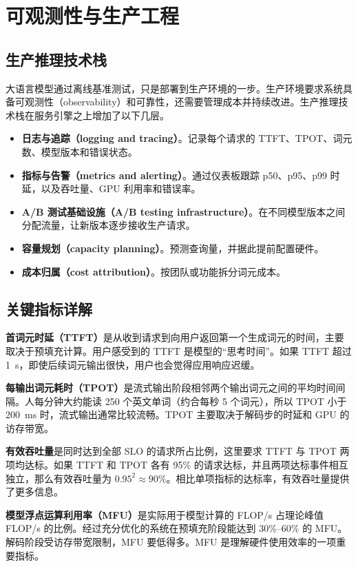 \chapter{可观测性与生产工程}

\section{生产推理技术栈}

大语言模型通过离线基准测试，只是部署到生产环境的一步。生产环境要求系统具备可观测性（observability）和可靠性，还需要管理成本并持续改进。生产推理技术栈在服务引擎之上增加了以下几层。
\begin{itemize}
  \item \textbf{日志与追踪（logging and tracing）}。记录每个请求的 TTFT、TPOT、词元数、模型版本和错误状态。
  \item \textbf{指标与告警（metrics and alerting）}。通过仪表板跟踪 p50、p95、p99 时延，以及吞吐量、GPU 利用率和错误率。
  \item \textbf{A/B 测试基础设施（A/B testing infrastructure）}。在不同模型版本之间分配流量，让新版本逐步接收生产请求。
  \item \textbf{容量规划（capacity planning）}。预测查询量，并据此提前配置硬件。
  \item \textbf{成本归属（cost attribution）}。按团队或功能拆分词元成本。
\end{itemize}

\section{关键指标详解}

\textbf{首词元时延（TTFT）}是从收到请求到向用户返回第一个生成词元的时间，主要取决于预填充计算。用户感受到的 TTFT 是模型的“思考时间”。如果 TTFT 超过 1~s，即使后续词元输出很快，用户也会觉得应用响应迟缓。

\textbf{每输出词元耗时（TPOT）}是流式输出阶段相邻两个输出词元之间的平均时间间隔。人每分钟大约能读 250 个英文单词（约合每秒 5 个词元），所以 TPOT 小于 200~ms 时，流式输出通常比较流畅。TPOT 主要取决于解码步的时延和 GPU 的访存带宽。

\textbf{有效吞吐量}是同时达到全部 SLO 的请求所占比例，这里要求 TTFT 与 TPOT 两项均达标。如果 TTFT 和 TPOT 各有 95\% 的请求达标，并且两项达标事件相互独立，那么有效吞吐量为 $0.95^2\approx90\%$。相比单项指标的达标率，有效吞吐量提供了更多信息。

\textbf{模型浮点运算利用率（MFU）}是实际用于模型计算的 FLOP/s 占理论峰值 FLOP/s 的比例。经过充分优化的系统在预填充阶段能达到 30\%–60\% 的 MFU。解码阶段受访存带宽限制，MFU 要低得多。MFU 是理解硬件使用效率的一项重要指标。

